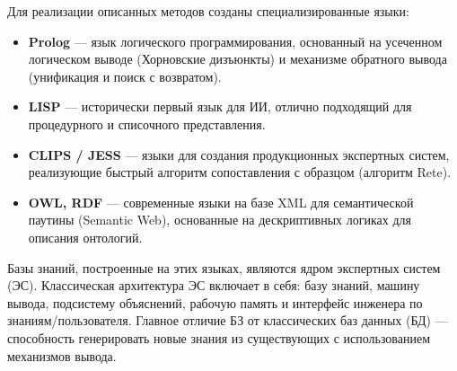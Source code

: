 \documentclass[12pt,a4paper]{article}
\begin{document}
Для реализации описанных методов созданы специализированные языки:
\begin{itemize}
    \item \textbf{Prolog} — язык логического программирования, основанный на усеченном логическом выводе (Хорновские дизъюнкты) и механизме обратного вывода (унификация и поиск с возвратом).
    \item \textbf{LISP} — исторически первый язык для ИИ, отлично подходящий для процедурного и списочного представления.
    \item \textbf{CLIPS / JESS} — языки для создания продукционных экспертных систем, реализующие быстрый алгоритм сопоставления с образцом (алгоритм Rete).
    \item \textbf{OWL, RDF} — современные языки на базе XML для семантической паутины (Semantic Web), основанные на дескриптивных логиках для описания онтологий.
\end{itemize}

Базы знаний, построенные на этих языках, являются ядром экспертных систем (ЭС). Классическая архитектура ЭС включает в себя: базу знаний, машину вывода, подсистему объяснений, рабочую память и интерфейс инженера по знаниям/пользователя. Главное отличие БЗ от классических баз данных (БД) — способность генерировать новые знания из существующих с использованием механизмов вывода.
\end{document}
